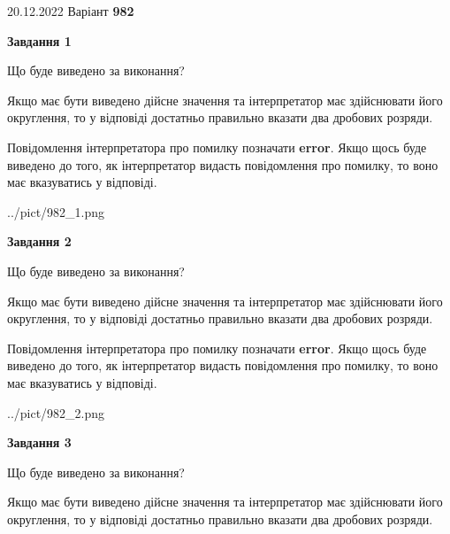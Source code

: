 \documentclass[12pt, ukrainian]{article}
\begin{document}
{20.12.2022 Варіант \No \textbf { 982 }\par}
{
\begin {Large}

{\begin {center}\textbf{Завдання 1}\end {center}}\par
Що буде виведено за виконання? \par

Якщо має бути виведено дійсне значення та інтерпретатор має здійснювати його округлення, 
то у відповіді достатньо правильно вказати два дробових розряди.

Повідомлення інтерпретатора про помилку позначати \textbf{error}.
Якщо щось буде виведено до того, як інтерпретатор видасть повідомлення про помилку, 
то воно має вказуватись у відповіді. \par

\begin{center}
	{../pict/982_1.png}
\end{center}
\newpage

{\begin {center}\textbf{Завдання 2}\end {center}}\par
Що буде виведено за виконання? \par

Якщо має бути виведено дійсне значення та інтерпретатор має здійснювати його округлення, 
то у відповіді достатньо правильно вказати два дробових розряди.

Повідомлення інтерпретатора про помилку позначати \textbf{error}.
Якщо щось буде виведено до того, як інтерпретатор видасть повідомлення про помилку, 
то воно має вказуватись у відповіді. \par

\begin{center}
	{../pict/982_2.png}
\end{center}
\newpage

{\begin {center}\textbf{Завдання 3}\end {center}}\par
Що буде виведено за виконання? \par

Якщо має бути виведено дійсне значення та інтерпретатор має здійснювати його округлення, 
то у відповіді достатньо правильно вказати два дробових розряди.


\end{Large}}
\end{document}
